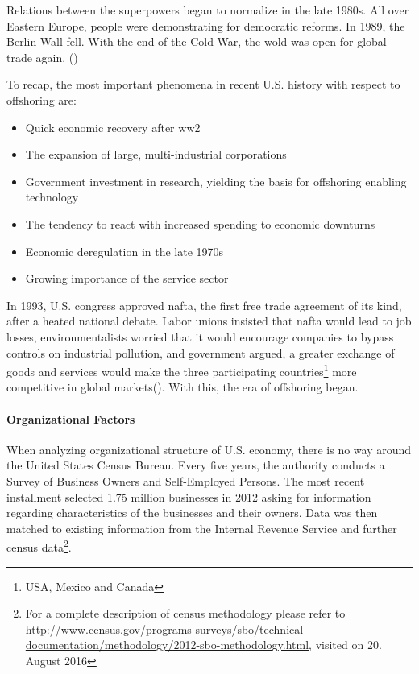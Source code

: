 Relations between the superpowers began to normalize in the late 1980s. All over Eastern Europe, people were demonstrating for democratic reforms. In 1989, the Berlin Wall fell. With the end of the Cold War, the wold was open for global trade again.
(\cite{Winkler.1994c})

To recap, the most important phenomena in recent U.S. history with respect to offshoring are:
\begin{itemize}
	\item Quick economic recovery after \gls{ww2}
	\item The expansion of large, multi-industrial corporations
	\item Government investment in research, yielding the basis for offshoring enabling technology
	\item The tendency to react with increased spending to economic downturns
	\item Economic deregulation in the late 1970s
	\item Growing importance of the service sector
	\end{itemize}
In 1993, U.S. congress approved \acrlong{nafta}, the first free trade agreement of its kind, after a heated national debate. Labor unions insisted that \acrshort{nafta} would lead to job losses, environmentalists worried that it would encourage companies to bypass controls on industrial pollution, and government argued, a greater exchange of goods and services would make the three participating countries\footnote{USA, Mexico and Canada} more competitive in global markets(\cite{Winkler.1994c}). With this, the era of offshoring began.

\paragraph{Organizational Factors}
When analyzing organizational structure of U.S. economy, there is no way around the United States Census Bureau. Every five years, the authority conducts a Survey of Business Owners and Self-Employed Persons. The most recent installment selected 1.75 million businesses in 2012 asking for information regarding characteristics of the businesses and their owners. Data was then matched to existing information from the Internal Revenue Service and further census data\footnote{For a complete description of census methodology please refer to \url{http://www.census.gov/programs-surveys/sbo/technical-documentation/methodology/2012-sbo-methodology.html}, visited on 20. August 2016}.



